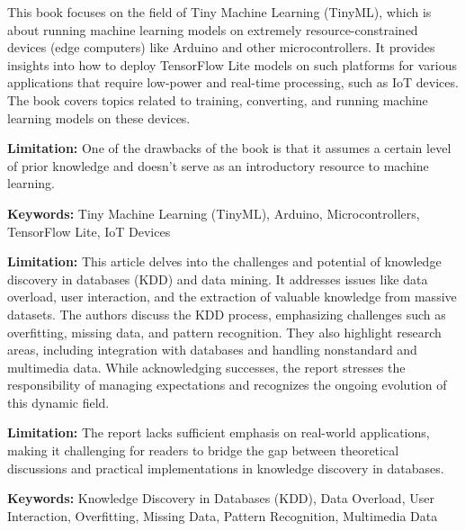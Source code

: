 { 
	This book \cite{Warden:2019} focuses on the field of Tiny Machine Learning (TinyML), which is about running machine learning models on extremely resource-constrained devices (edge computers) like Arduino and other microcontrollers. It provides insights into how to deploy TensorFlow Lite models on such platforms for various applications that require low-power and real-time processing, such as IoT devices. The book covers topics related to training, converting, and running machine learning models on these devices.
	
	\bigskip
	
	\textbf{Limitation:} One of the drawbacks of the book is that it assumes a certain level of prior knowledge and doesn't serve as an introductory resource to machine learning.
	
	\scriptsize{\textbf{Keywords:} Tiny Machine Learning (TinyML), Arduino, Microcontrollers, TensorFlow Lite, IoT Devices}
}


{ 
	\textbf{Limitation:} This article \cite{Fayyad:1996} delves into the challenges and potential of knowledge discovery in databases (KDD) and data mining. It addresses issues like data overload, user interaction, and the extraction of valuable knowledge from massive datasets. The authors discuss the KDD process, emphasizing challenges such as overfitting, missing data, and pattern recognition. They also highlight research areas, including integration with databases and handling nonstandard and multimedia data. While acknowledging successes, the report stresses the responsibility of managing expectations and recognizes the ongoing evolution of this dynamic field.
	
	\bigskip
	
	\textbf{Limitation:} The report lacks sufficient emphasis on real-world applications, making it challenging for readers to bridge the gap between theoretical discussions and practical implementations in knowledge discovery in databases.
	
	\scriptsize{\textbf{Keywords:} Knowledge Discovery in Databases (KDD), Data Overload, User Interaction, Overfitting, Missing Data, Pattern Recognition, Multimedia Data}
}


